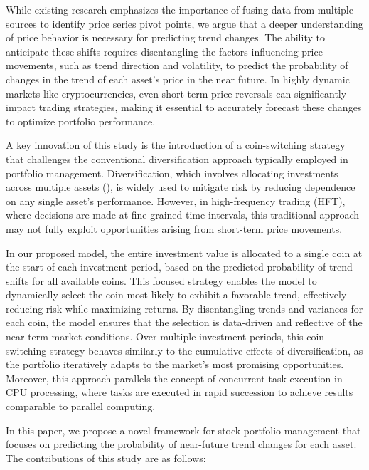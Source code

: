 While existing research emphasizes the importance of fusing data from multiple sources to identify price series pivot points, we argue that a deeper understanding of price behavior is necessary for predicting trend changes. The ability to anticipate these shifts requires disentangling the factors influencing price movements, such as trend direction and volatility, to predict the probability of changes in the trend of each asset's price in the near future. In highly dynamic markets like cryptocurrencies, even short-term price reversals can significantly impact trading strategies, making it essential to accurately forecast these changes to optimize portfolio performance.

A key innovation of this study is the introduction of a coin-switching strategy that challenges the conventional diversification approach typically employed in portfolio management. Diversification, which involves allocating investments across multiple assets (\citet{markovitz1959portfolio}), is widely used to mitigate risk by reducing dependence on any single asset's performance. However, in high-frequency trading (HFT), where decisions are made at fine-grained time intervals, this traditional approach may not fully exploit opportunities arising from short-term price movements.

In our proposed model, the entire investment value is allocated to a single coin at the start of each investment period, based on the predicted probability of trend shifts for all available coins. This focused strategy enables the model to dynamically select the coin most likely to exhibit a favorable trend, effectively reducing risk while maximizing returns. By disentangling trends and variances for each coin, the model ensures that the selection is data-driven and reflective of the near-term market conditions. Over multiple investment periods, this coin-switching strategy behaves similarly to the cumulative effects of diversification, as the portfolio iteratively adapts to the market's most promising opportunities. Moreover, this approach parallels the concept of concurrent task execution in CPU processing, where tasks are executed in rapid succession to achieve results comparable to parallel computing.

In this paper, we propose a novel framework for stock portfolio management that focuses on predicting the probability of near-future trend changes for each asset. The contributions of this study are as follows:

